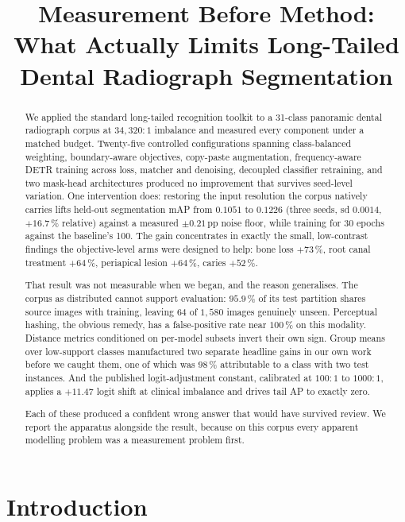 \documentclass[10pt,twocolumn,letterpaper]{article}
\title{\vspace{-2em}\bfseries Measurement Before Method: What Actually Limits
Long-Tailed Dental Radiograph Segmentation}
\author{}
\date{}
\begin{document}
\maketitle

\begin{abstract}
We applied the standard long-tailed recognition toolkit to a 31-class panoramic
dental radiograph corpus at $34{,}320{:}1$ imbalance and measured every component
under a matched budget. Twenty-five controlled configurations spanning
class-balanced weighting, boundary-aware objectives, copy-paste augmentation,
frequency-aware DETR training across loss, matcher and denoising, decoupled
classifier retraining, and two mask-head architectures produced no improvement
that survives seed-level variation. One intervention does: restoring the input
resolution the corpus natively carries lifts held-out segmentation mAP from
$0.1051$ to $0.1226$ (three seeds, sd $0.0014$, $+16.7$\,\% relative) against a
measured $\pm0.21$\,pp noise floor, while training for 30 epochs against the
baseline's 100. The gain concentrates in exactly the small, low-contrast
findings the objective-level arms were designed to help: bone loss $+73$\,\%,
root canal treatment $+64$\,\%, periapical lesion $+64$\,\%, caries $+52$\,\%.

That result was not measurable when we began, and the reason generalises. The
corpus as distributed cannot support evaluation: $95.9$\,\% of its test partition
shares source images with training, leaving $64$ of $1{,}580$ images genuinely
unseen. Perceptual hashing, the obvious remedy, has a false-positive rate near
$100$\,\% on this modality. Distance metrics conditioned on per-model subsets
invert their own sign. Group means over low-support classes manufactured two
separate headline gains in our own work before we caught them, one of which was
$98$\,\% attributable to a class with two test instances. And the published
logit-adjustment constant, calibrated at $100{:}1$ to $1000{:}1$, applies a
$+11.47$ logit shift at clinical imbalance and drives tail AP to exactly zero.

Each of these produced a confident wrong answer that would have survived review.
We report the apparatus alongside the result, because on this corpus every
apparent modelling problem was a measurement problem first.
\end{abstract}

\section{Introduction}
\end{document}
